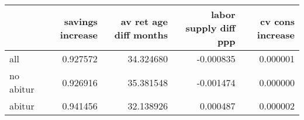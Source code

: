 \begin{tabular}{lrrrr}
\toprule
 & savings increase & av ret age diff months & labor supply diff ppp & cv cons increase \\
\midrule
all & 0.927572 & 34.324680 & -0.000835 & 0.000001 \\
no abitur & 0.926916 & 35.381548 & -0.001474 & 0.000000 \\
abitur & 0.941456 & 32.138926 & 0.000487 & 0.000002 \\
\bottomrule
\end{tabular}
